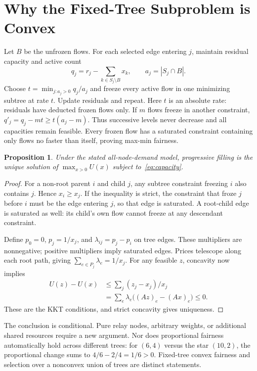 \documentclass[conference,letterpaper]{IEEEtran}
\newtheorem{proposition}{Proposition}
\begin{document}
\section{Why the Fixed-Tree Subproblem is Convex}
Let $B$ be the unfrozen flows. For each selected edge entering $j$, maintain residual capacity and active count
\begin{equation}
q_j=r_j-\sum_{k\in S_j\setminus B}x_k,\qquad a_j=|S_j\cap B|.
\end{equation}
Choose $t=\min_{j:a_j>0}q_j/a_j$ and freeze every active flow in one minimizing subtree at rate $t$. Update residuals and repeat. Here $t$ is an absolute rate: residuals have deducted frozen flows only. If $m$ flows freeze in another constraint, $q'_j=q_j-mt\ge t(a_j-m)$. Thus successive levels never decrease and all capacities remain feasible. Every frozen flow has a saturated constraint containing only flows no faster than itself, proving max-min fairness.

\begin{proposition}
Under the stated all-node-demand model, progressive filling is the unique solution of $\max_{x>0}U(x)$ subject to~\eqref{eq:capacity}.
\end{proposition}
\begin{proof}
For a non-root parent $i$ and child $j$, any subtree constraint freezing $i$ also contains $j$. Hence $x_i\ge x_j$. If the inequality is strict, the constraint that froze $j$ before $i$ must be the edge entering $j$, so that edge is saturated. A root-child edge is saturated as well: its child's own flow cannot freeze at any descendant constraint.

Define $p_0=0$, $p_j=1/x_j$, and $\lambda_{ij}=p_j-p_i$ on tree edges. These multipliers are nonnegative; positive multipliers imply saturated edges. Prices telescope along each root path, giving $\sum_{e\in P_j}\lambda_e=1/x_j$. For any feasible $z$, concavity now implies
\begin{align}
U(z)-U(x)&\le\sum_j(z_j-x_j)/x_j\\
&=\sum_e\lambda_e\big((Az)_e-(Ax)_e\big)\le0.
\end{align}
These are the KKT conditions, and strict concavity gives uniqueness.
\end{proof}

The conclusion is conditional. Pure relay nodes, arbitrary weights, or additional shared resources require a new argument. Nor does proportional fairness automatically hold across different trees: for $(6,4)$ versus the star $(10,2)$, the proportional change sums to $4/6-2/4=1/6>0$. Fixed-tree convex fairness and selection over a nonconvex union of trees are distinct statements.
\end{document}
